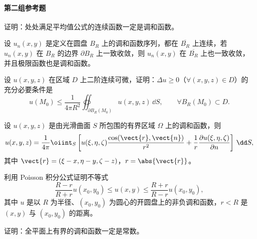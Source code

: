 \paragraph{第二组参考题}

\begin{xreferenceproblem}[1]
证明：处处满足平均值公式的连续函数一定是调和函数。
\end{xreferenceproblem}

\begin{xreferenceproblem}[2]
设 $u_n(x,y)$ 是定义在圆盘 $B_R$ 上的调和函数序列，都在 $\overline{B_R}$ 上连续，若 $u_n(x,y)$ 在 $B_R$ 的边界 $\partial B_R$ 上一致收敛，则 $u_n(x,y)$ 在 $\overline{B_R}$ 上也一致收敛，并且极限函数也是调和函数。
\end{xreferenceproblem}

\begin{xreferenceproblem}[3]
设 $u(x,y,z)$ 在区域 $D$ 上二阶连续可微，证明：$\Delta u\ge0$（$\forall(x,y,z)\in D$）的充分必要条件是
\[
  u(M_0)\le\frac{1}{4\pi R^2}\oiint_{\partial B_R(M_0)}u(x,y,z)\,\dd S,
  \qquad \forall B_R(M_0)\subset D.
\]
\end{xreferenceproblem}

\begin{xreferenceproblem}[4]
设 $u(x,y,z)$ 是由光滑曲面 $S$ 所包围的有界区域 $\Omega$ 上的调和函数，则
\[
  u(x,y,z)=\frac{1}{4\pi}\oiint_S\left[
  u(\xi,\eta,\zeta)\frac{\cos(\vect{r},\vect{n})}{r^2}
  +\frac{1}{r}\frac{\partial u(\xi,\eta,\zeta)}{\partial n}
  \right]\,\dd S,
\]
其中 $\vect{r}=(\xi-x,\eta-y,\zeta-z)$，$r=\abs{\vect{r}}$。
\end{xreferenceproblem}

\begin{xreferenceproblem}[5]
利用 Poisson 积分公式证明不等式
\[
  \frac{R-r}{R+r}u(x_0,y_0)\le u(x,y)\le\frac{R+r}{R-r}u(x_0,y_0),
\]
其中 $u$ 是以 $R$ 为半径、$(x_0,y_0)$ 为圆心的开圆盘上的非负调和函数，$r<R$ 是 $(x,y)$ 与 $(x_0,y_0)$ 的距离。
\end{xreferenceproblem}

\begin{xreferenceproblem}[6]
证明：全平面上有界的调和函数一定是常数。
\end{xreferenceproblem}
